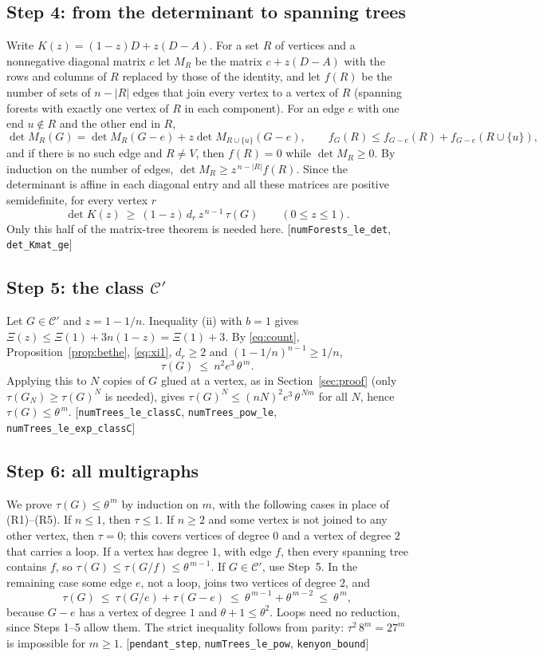 \documentclass[11pt]{amsart}
\theoremstyle{plain}
\theoremstyle{remark}
\newcommand{\cC}{\mathcal{C}}
\newcommand{\code}[1]{\texttt{#1}}
\newcommand{\tht}{\theta}
\begin{document}
\subsection*{Step 4: from the determinant to spanning trees}
Write $K(z)=(1-z)D+z(D-A)$. For a set $R$ of vertices and a nonnegative diagonal matrix $c$ let $M_R$ be the
matrix $c+z(D-A)$ with the rows and columns of $R$ replaced by those of the identity, and let $f(R)$ be the
number of sets of $n-|R|$ edges that join every vertex to a vertex of $R$ (spanning forests with exactly one
vertex of $R$ in each component). For an edge $e$ with one end $u\notin R$ and the other end in $R$,
\[
  \det M_R(G)=\det M_R(G-e)+z\det M_{R\cup\{u\}}(G-e),\qquad f_G(R)\le f_{G-e}(R)+f_{G-e}(R\cup\{u\}),
\]
and if there is no such edge and $R\ne V$, then $f(R)=0$ while $\det M_R\ge0$. By induction on the number of
edges, $\det M_R\ge z^{\,n-|R|}f(R)$. Since the determinant is affine in each diagonal entry and all these
matrices are positive semidefinite, for every vertex $r$
\begin{equation}\label{eq:count}
  \det K(z)\ \ge\ (1-z)\,d_r\,z^{\,n-1}\,\tau(G)\qquad(0\le z\le1).
\end{equation}
Only this half of the matrix-tree theorem is needed here. [\code{numForests\_le\_det}, \code{det\_Kmat\_ge}]

\subsection*{Step 5: the class $\cC'$}
Let $G\in\cC'$ and $z=1-1/n$. Inequality (ii) with $b=1$ gives $\Xi(z)\le\Xi(1)+3n(1-z)=\Xi(1)+3$. By
\eqref{eq:count}, Proposition~\ref{prop:bethe}, \eqref{eq:xi1}, $d_r\ge2$ and $(1-1/n)^{n-1}\ge1/n$,
\[
  \tau(G)\ \le\ n^2e^3\,\tht^{\,m}.
\]
Applying this to $N$ copies of $G$ glued at a vertex, as in Section~\ref{sec:proof} (only
$\tau(G_N)\ge\tau(G)^N$ is needed), gives $\tau(G)^N\le(nN)^2e^3\,\tht^{\,Nm}$ for all $N$, hence
$\tau(G)\le\tht^{\,m}$. [\code{numTrees\_le\_classC}, \code{numTrees\_pow\_le}, \code{numTrees\_le\_exp\_classC}]

\subsection*{Step 6: all multigraphs}
We prove $\tau(G)\le\tht^{\,m}$ by induction on $m$, with the following cases in place of (R1)--(R5).
If $n\le1$, then $\tau\le1$. If $n\ge2$ and some vertex is not joined to any other vertex, then $\tau=0$; this
covers vertices of degree $0$ and a vertex of degree $2$ that carries a loop. If a vertex has degree $1$, with
edge $f$, then every spanning tree contains $f$, so $\tau(G)\le\tau(G/f)\le\tht^{\,m-1}$. If $G\in\cC'$, use
Step~5. In the remaining case some edge $e$, not a loop, joins two vertices of degree $2$, and
\[
  \tau(G)\ \le\ \tau(G/e)+\tau(G-e)\ \le\ \tht^{\,m-1}+\tht^{\,m-2}\ \le\ \tht^{\,m},
\]
because $G-e$ has a vertex of degree $1$ and $\tht+1\le\tht^{2}$. Loops need no reduction, since Steps 1--5 allow
them. The strict inequality follows from parity: $\tau^2\,8^m=27^m$ is impossible for $m\ge1$.
[\code{pendant\_step}, \code{numTrees\_le\_pow}, \code{kenyon\_bound}]
\end{document}
